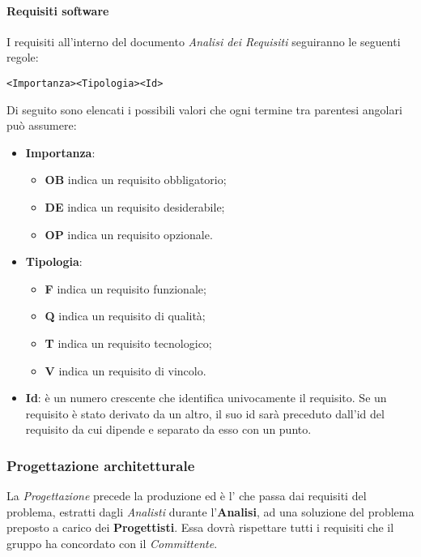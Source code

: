 \documentclass{scalatekids-article}
\begin{document}
\paragraph{Requisiti software}

\label{sec:adr}
I requisiti all'interno del documento \textit{Analisi dei Requisiti} seguiranno le seguenti regole:
\begin{center}
    \verb=<Importanza><Tipologia><Id>=
\end{center}
Di seguito sono elencati i possibili valori che ogni termine tra parentesi angolari può assumere:
\begin{itemize}
    \item \textbf{Importanza}:
        \begin{itemize}
            \item \textbf{OB} indica un requisito obbligatorio;
            \item \textbf{DE} indica un requisito desiderabile;
            \item \textbf{OP} indica un requisito opzionale.
        \end{itemize}
    \item \textbf{Tipologia}:
        \begin{itemize}
            \item \textbf{F} indica un requisito funzionale;
            \item \textbf{Q} indica un requisito di qualità;
            \item \textbf{T} indica un requisito tecnologico;
            \item \textbf{V} indica un requisito di vincolo.
        \end{itemize}
    \item \textbf{Id}: è un numero crescente che identifica univocamente il requisito. Se un requisito è stato derivato da un altro, il suo id sarà preceduto dall'id del requisito da cui dipende e separato da esso con un punto.
\end{itemize}

\subsubsection{Progettazione architetturale}

La \textit{Progettazione} precede la produzione ed è l' che
passa dai requisiti del problema, estratti dagli \textit{Analisti} durante
l'\textbf{Analisi}, ad una soluzione del problema preposto a carico dei
\textbf{Progettisti}. Essa dovrà rispettare tutti i requisiti che il gruppo ha
concordato con il \textit{Committente}.\\
\end{document}
